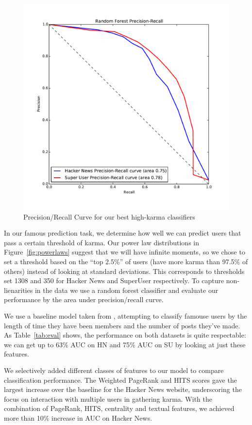 \documentclass[11pt]{article}
\begin{document}
\begin{figure}[h]
\centering
\includegraphics[width=\linewidth]{classification_pr_curve}
\caption{Precision/Recall Curve for our best high-karma classifiers}
\label{fig:classification}
\end{figure}

In our famous prediction task, we determine how well we can predict users that
pass a certain threshold of karma. Our power law distributions 
in Figure~\ref{fig:powerlaws} suggest that we will have infinite moments, so we
chose to set a threshold based on the ``top 2.5\%'' of users 
(have more karma than 97.5\% of others) instead of looking at standard
deviations. This corresponds to thresholds set 1308 and 350 for 
Hacker News and SuperUser respectively.
To capture non-lienarities in the data we use a random forest classifier and
evaluate our performance by the area under precision/recall curve.

We use a baseline model taken from \citet{movshovitzanalysis}, attempting to
classify famouse users by the length of time they have been members and the number
of posts they've made. As Table~\ref{tab:eval} shows, the performance on both
datasets is quite respectable: we can get up to 63\% AUC on HN and 75\% AUC on
SU by looking at just these features.

We selectively added different classes of features to our model to compare
classification performance. The Weighted PageRank and HITS scores gave the
largest increase over the baseline for the Hacker News website, underscoring the
focus on interaction with multiple users in gathering karma.  With the
combination of PageRank, HITS, centrality and textual features, we achieved more
than 10\% increase in AUC on Hacker News.
\end{document}
